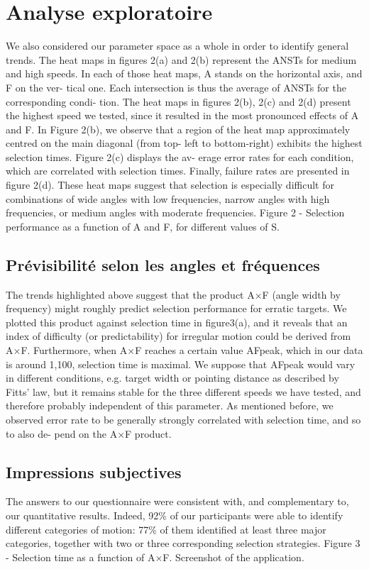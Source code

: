 \section{Analyse exploratoire}
	We also considered our parameter space as a whole in order to identify general trends.
The heat maps in figures 2(a) and 2(b) represent the ANSTs for medium and high
speeds. In each of those heat maps, A stands on the horizontal axis, and F on the ver-
tical one. Each intersection is thus the average of ANSTs for the corresponding condi-
tion. The heat maps in figures 2(b), 2(c) and 2(d) present the highest speed we tested,
since it resulted in the most pronounced effects of A and F. In Figure 2(b), we observe
that a region of the heat map approximately centred on the main diagonal (from top-
left to bottom-right) exhibits the highest selection times. Figure 2(c) displays the av-
erage error rates for each condition, which are correlated with selection times. Finally,
failure rates are presented in figure 2(d).
These heat maps suggest that selection is especially difficult for combinations of
wide angles with low frequencies, narrow angles with high frequencies, or medium
angles with moderate frequencies.
Figure 2 - Selection performance as a function of A and F, for different values of S.

	\subsection{Prévisibilité selon les angles et fréquences}
	The trends highlighted above suggest that the product A×F (angle width by frequency) might roughly predict selection performance for erratic targets. We plotted this product against selection time in figure3(a), and it reveals that an index of difficulty (or predictability) for irregular motion could be derived from A×F. Furthermore, when A×F reaches a certain value AFpeak,
which in our data is around 1,100, selection time is maximal. We suppose that AFpeak
would vary in different conditions, e.g. target width or pointing distance as described
by Fitts’ law, but it remains stable for the three different speeds we have tested, and
therefore probably independent of this parameter. As mentioned before, we observed
error rate to be generally strongly correlated with selection time, and so to also de-
pend on the A×F product.

	\subsection{Impressions subjectives}
	The answers to our questionnaire were consistent with, and complementary to, our quantitative results. Indeed, 92\%{} of our participants were able to identify different categories of motion: 77\%{} of them identified at least three major categories, together with two or three corresponding selection strategies.
Figure 3 - Selection time as a function of A×F. Screenshot of the application.

